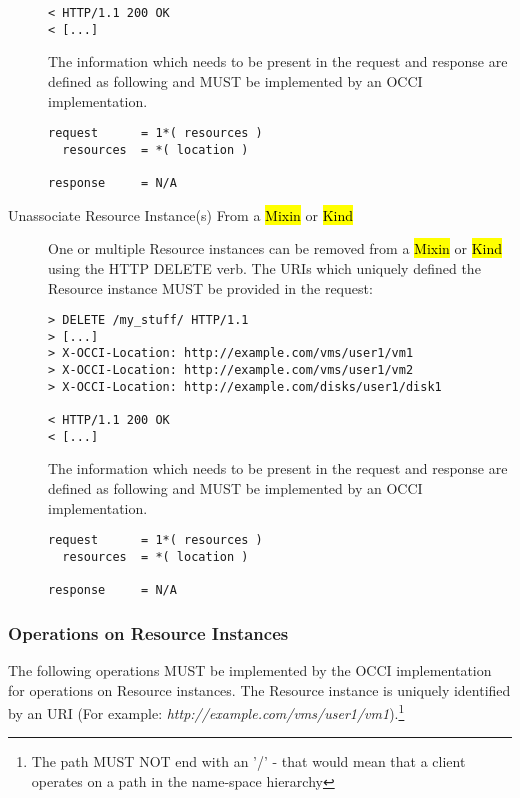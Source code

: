 \documentclass[10pt,a4paper]{article}
\begin{document}
\begin{description}
\begin{verbatim}
< HTTP/1.1 200 OK
< [...]
\end{verbatim}

    The information which needs to be present in the request and
    response are defined as following and MUST be implemented by an
    OCCI implementation.

\begin{verbatim}
request      = 1*( resources )
  resources  = *( location )

response     = N/A
\end{verbatim}

  \item[Unassociate Resource Instance(s) From a \hl{Mixin} or
    \hl{Kind}] One or multiple Resource instances can be removed from
    a \hl{Mixin} or \hl{Kind} using the HTTP DELETE verb. The URIs
    which uniquely defined the Resource instance MUST be provided in
    the request:

\begin{verbatim}
> DELETE /my_stuff/ HTTP/1.1
> [...]
> X-OCCI-Location: http://example.com/vms/user1/vm1
> X-OCCI-Location: http://example.com/vms/user1/vm2
> X-OCCI-Location: http://example.com/disks/user1/disk1

< HTTP/1.1 200 OK
< [...]
\end{verbatim}

    The information which needs to be present in the request and
    response are defined as following and MUST be implemented by an
    OCCI implementation.

\begin{verbatim}
request      = 1*( resources )
  resources  = *( location )

response     = N/A
\end{verbatim}

\end{description}

\subsubsection{Operations on Resource Instances}
\label{sec:ops_on_instances}
The following operations MUST be implemented by the OCCI
implementation for operations on Resource instances. The Resource
instance is uniquely identified by an URI (For example:
\emph{http://example.com/vms/user1/vm1}).\footnote{The path MUST NOT
  end with an '/' - that would mean that a client operates on a path
  in the name-space hierarchy}
\end{document}
